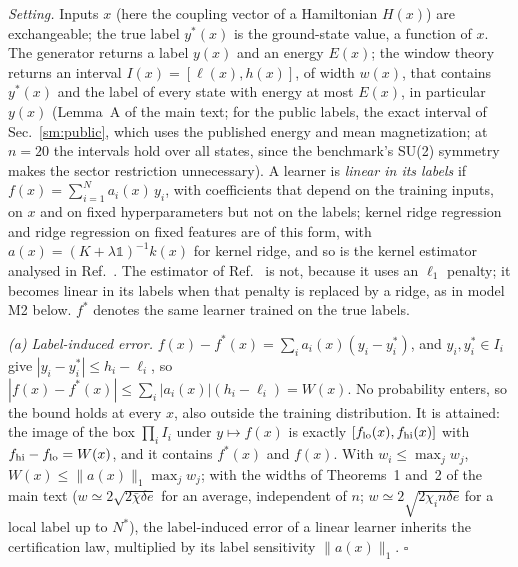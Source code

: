 \documentclass[aps,prx,onecolumn,10pt,nofootinbib,longbibliography,floatfix]{revtex4-2}
\theoremstyle{remark}
\newcommand{\de}{\delta e}
\begin{document}
\emph{Setting.} Inputs $x$ (here the coupling vector of a Hamiltonian $H(x)$) are exchangeable; the true label
$y^*(x)$ is the ground-state value, a function of $x$. The generator returns a label $y(x)$ and an energy $E(x)$; the
window theory returns an interval $I(x)=[\ell(x),h(x)]$, of width $w(x)$, that contains $y^*(x)$ and the label of
every state with energy at most $E(x)$, in particular $y(x)$ (Lemma~A of the main text; for the public labels, the
exact interval of Sec.~\ref{sm:public}, which uses the published energy and mean magnetization; at $n=20$ the intervals hold over all states, %
since the benchmark's SU(2) symmetry makes the sector restriction unnecessary). A learner is \emph{linear in its %
labels} if $f(x)=\sum_{i=1}^Na_i(x)\,y_i$, with coefficients that depend on the training inputs, on $x$ and on fixed
hyperparameters but not on the labels; kernel ridge regression and ridge regression on fixed features are of this
form, with $a(x)=(K+\lambda\mathbb 1)^{-1}k(x)$ for kernel ridge, and so is the kernel estimator analysed in
Ref.~\cite{huang2022}. The estimator of Ref.~\cite{lewis2024} is not, because it uses an $\ell_1$ penalty; it
becomes linear in its labels when that penalty is replaced by a ridge, as in model M2 below. $f^*$ denotes the same
learner trained on the true labels.

\emph{(a) Label-induced error.} $f(x)-f^*(x)=\sum_ia_i(x)(y_i-y_i^*)$, and $y_i,y_i^*\in I_i$ give
$|y_i-y_i^*|\le h_i-\ell_i$, so $|f(x)-f^*(x)|\le\sum_i|a_i(x)|(h_i-\ell_i)=W(x)$. No probability enters, so the bound
holds at every $x$, also outside the training distribution. It is attained: the image of the box $\prod_i I_i$ under
$y\mapsto f(x)$ is exactly $[f_{\rm lo}(x),f_{\rm hi}(x)]$ with $f_{\rm hi}-f_{\rm lo}=W(x)$, and it contains
$f^*(x)$ and $f(x)$. With $w_i\le\max_jw_j$, $W(x)\le\|a(x)\|_1\max_jw_j$; with the widths of Theorems~1 and~2 of %
the main text ($w\simeq2\sqrt{2\bar\chi\de}$ for an average, independent of $n$; $w\simeq2\sqrt{2\chi_in\de}$ for a
local label up to $N^*$), the label-induced error of a linear learner inherits the certification law, multiplied by
its label sensitivity $\|a(x)\|_1$. $\square$
\end{document}
